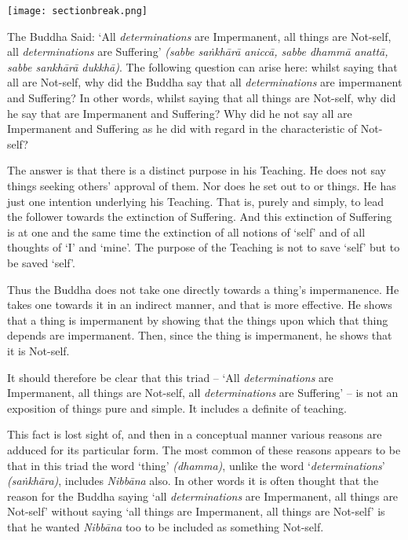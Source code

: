 \texttt{[image: sectionbreak.png]}

The Buddha Said: `All \emph{determinations} are Impermanent, all things are Not-self, all \emph{determinations} are Suffering' \emph{(sabbe saṅkhārā aniccā, sabbe dhammā anattā, sabbe sankhārā dukkhā)}. The following question can arise here: whilst saying that all  are Not-self, why did the Buddha say that all \emph{determinations} are impermanent and Suffering? In other words, whilst saying that all things are Not-self, why did he say that  are Impermanent and Suffering? Why did he not  say all  are Impermanent and Suffering as he did with regard in the characteristic of Not-self?

The answer is that there is a distinct purpose in his Teaching. He does not say things seeking others' approval of them. Nor does he set out to  or  things. He has just one intention underlying his Teaching. That is, purely and simply, to lead the follower towards the extinction of Suffering. And this extinction of Suffering is at one and the same time the extinction of all notions of `self' and of all thoughts of `I' and `mine'. The purpose of the Teaching is not to save `self' but to be saved  `self'.

Thus the Buddha does not take one directly towards a thing's impermanence. He takes one towards it in an indirect manner, and that is more effective. He shows that a thing is impermanent by showing that the things upon which that thing depends are impermanent. Then, since the thing is impermanent, he shows that it is Not-self.

It should therefore be clear that this triad -- `All \emph{determinations} are Impermanent, all things are Not-self, all \emph{determinations} are Suffering' -- is not an exposition of things pure and simple. It includes a definite  of teaching.

This fact is lost sight of, and then in a conceptual manner various reasons are adduced for its particular form. The most common of these reasons appears to be that in this triad the word `thing' \emph{(dhamma)}, unlike the word `\emph{determinations}' \emph{(saṅkhāra)}, includes \emph{Nibbāna} also. In other words it is often thought that the reason for the Buddha saying `all \emph{determinations} are Impermanent, all things are Not-self' without saying `all things are Impermanent, all things are Not-self' is that he wanted \emph{Nibbāna} too to be included as something Not-self.

